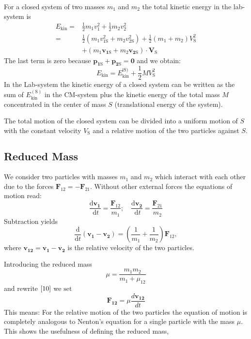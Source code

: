 \documentclass[12pt]{book}
\theoremstyle{definition}\newtheorem{dfn}{Définition}[chapter]
\theoremstyle{plain}\newtheorem{thm}{Théorème}[chapter]
\theoremstyle{plain}\newtheorem{prp}{Proposition}[chapter]
\theoremstyle{plain}\newtheorem{lem}{\bf Lemme}[chapter]
\theoremstyle{plain}\newtheorem{axm}{\bf Axiome}[chapter]
\theoremstyle{plain}\newtheorem{lmm}{\bf Lemme}[chapter]
\theoremstyle{plain}\newtheorem{cor}{\bf Corollaire}[chapter]
\theoremstyle{remark}\newtheorem{rem}{Remarque}[chapter]
\begin{document}
For a closed system of two masses $m_{1}$ and $m_{2}$ the total kinetic energy in the lab-system is
$$
\begin{aligned}
E_{\mathrm{kin}}=& \frac{1}{2} m_{1} v_{1}^{2}+\frac{1}{2} m_{2} v_{2}^{2} \\
=& \frac{1}{2}\left(m_{1} v_{1\mathrm{S}}^{2}+m_{2} v_{2\mathrm{S}}^{2}\right)+\frac{1}{2}\left(m_{1}+m_{2}\right) V_{\mathrm{S}}^{2} \\
&+\left(m_{1} \boldsymbol{v_{1\mathrm{S}}}+m_{2} \boldsymbol{v_{2\mathrm{S}}}\right) \cdot \boldsymbol{V}_{\mathrm{S}}
\end{aligned}
$$
The last term is zero because $\boldsymbol{p_{1\mathrm{S}}}+\boldsymbol{p_{2\mathrm{S}}}=\boldsymbol{0}$ and we obtain:
\begin{equation}
E_{\mathrm{kin}}=E_{\mathrm{kin}}^{\mathrm{iS})}+\frac{1}{2} M V_{\mathrm{S}}^{2}
\end{equation}
In the Lab-system the kinetic energy of a closed system can be written as the sum of $E_{\mathrm{kin}}^{(\mathrm{S})}$ in the CM-system plus the kinetic energy of the total mass $M$ concentrated in the center of mass $S$ (translational energy of the system).

The total motion of the closed system can be divided into a uniform motion of $S$ with the constant velocity $V_{\mathrm{S}}$ and a relative motion of the two particles against $S$.
\subsection{Reduced Mass}
We consider two particles with masses $m_{1}$ and $m_{2}$ which interact with each other due to the forces $\boldsymbol{F}_{12}=-\boldsymbol{F}_{21}$. Without other external forces the equations of motion read:
\begin{equation}
\frac{\mathrm{d} \boldsymbol{v_{1}}}{\mathrm{~d} t}=\frac{\boldsymbol{F}_{12}}{m_{1}} ; \quad \frac{\mathrm{d} \boldsymbol{v_{2}}}{\mathrm{~d} t}=\frac{\boldsymbol{F}_{21}}{m_{2}}
\end{equation}
Subtraction yields
\begin{equation}
\frac{\mathrm{d}}{\mathrm{d} t}\left(\boldsymbol{v_{1}}-\boldsymbol{v_{2}}\right)=\left(\frac{1}{m_{1}}+\frac{1}{m_{2}}\right) \boldsymbol{F}_{12},\label{10}
\end{equation}
where $\boldsymbol{v_{12}}=\boldsymbol{v_{1}}-\boldsymbol{v_{2}}$ is the relative velocity of the two particles.

Introducing the reduced mass
\begin{equation}
\mu=\frac{m_{1} m_{2}}{m_{1}+\mu_{12}}\label{11}
\end{equation}
and rewrite $\ref{10}$ we $\mathrm{set}$
\begin{equation}
\boldsymbol{F_{12}}=\mu \frac{d \boldsymbol{v_{12}}}{d t}
\end{equation}
This means: For the relative motion of the two particles the equation of motion is completely analogous to Nenton's equation for a single particle with the mass $\mu$. This shows the usefulness of defining the reduced mass,
\end{document}
